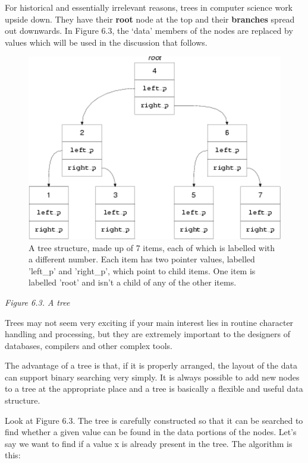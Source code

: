    For historical and essentially irrelevant reasons, trees in computer
    science work upside down. They have their \textbf{root} node at the top
    and their \textbf{branches} spread out downwards. In Figure 6.3, the `data' members of the nodes are replaced by values
    which will be used in the discussion that follows.


   \begin{figure}\centering\includegraphics[type=pdf,read=.pdf,ext=.pdf,scale=1.0]{figure/6.3}\caption{A tree structure, made up of 7 items, each of which is labelled            with a different number.  Each item has two pointer values,            labelled 'left\_p' and 'right\_p', which point to child items.            One item is labelled 'root' and isn't a child of any of the other            items.}\end{figure}

\begin{center}\textit{Figure 6.3. A tree}\end{center}


   Trees may not seem very exciting if your main interest lies in routine
    character handling and processing, but they are extremely important to the
    designers of databases, compilers and other complex tools.


   The advantage of a tree is that, if it is properly arranged, the layout
    of the data can support binary searching very simply. It is always possible
    to add new nodes to a tree at the appropriate place and a tree is basically
    a flexible and useful data structure.


   Look at Figure 6.3. The tree is carefully constructed so
    that it can be searched to find whether a given value can be found in the
    data portions of the nodes. Let's say we want to find if a value
    x is already present in the tree. The algorithm is this:


